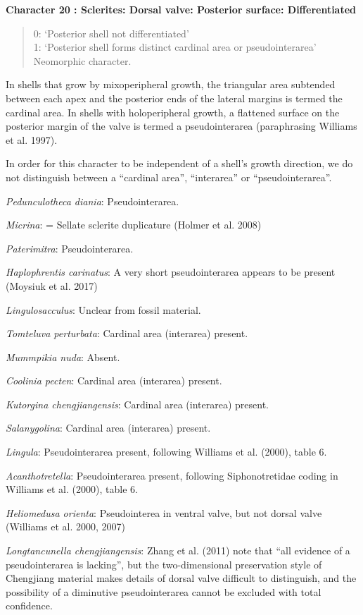 \documentclass[]{book}
\theoremstyle{definition}
\theoremstyle{definition}
\theoremstyle{definition}
\theoremstyle{remark}
\begin{document}
\textbf{Character 20 : Sclerites: Dorsal valve: Posterior surface:
Differentiated }

\begin{quote}
0: `Posterior shell not differentiated'\\
1: `Posterior shell forms distinct cardinal area or pseudointerarea'\\
Neomorphic character.
\end{quote}

In shells that grow by mixoperipheral growth, the triangular area
subtended between each apex and the posterior ends of the lateral
margins is termed the cardinal area. In shells with holoperipheral
growth, a flattened surface on the posterior margin of the valve is
termed a pseudointerarea (paraphrasing Williams et al. 1997).

In order for this character to be independent of a shell's growth
direction, we do not distinguish between a ``cardinal area'',
``interarea'' or ``pseudointerarea''.

\emph{Pedunculotheca diania}: Pseudointerarea.

\emph{Micrina}: = Sellate sclerite duplicature (Holmer et al. 2008)

\emph{Paterimitra}: Pseudointerarea.

\emph{Haplophrentis carinatus}: A very short pseudointerarea appears to
be present (Moysiuk et al. 2017)

\emph{Lingulosacculus}: Unclear from fossil material.

\emph{Tomteluva perturbata}: Cardinal area (interarea) present.

\emph{Mummpikia nuda}: Absent.

\emph{Coolinia pecten}: Cardinal area (interarea) present.

\emph{Kutorgina chengjiangensis}: Cardinal area (interarea) present.

\emph{Salanygolina}: Cardinal area (interarea) present.

\emph{Lingula}: Pseudointerarea present, following Williams et al.
(2000), table 6.

\emph{Acanthotretella}: Pseudointerarea present, following
Siphonotretidae coding in Williams et al. (2000), table 6.

\emph{Heliomedusa orienta}: Pseudointerea in ventral valve, but not
dorsal valve (Williams et al. 2000, 2007)

\emph{Longtancunella chengjiangensis}: Zhang et al. (2011) note that
``all evidence of a pseudointerarea is lacking'', but the
two-dimensional preservation style of Chengjiang material makes details
of dorsal valve difficult to distinguish, and the possibility of a
diminutive pseudointerarea cannot be excluded with total confidence.
\end{document}
